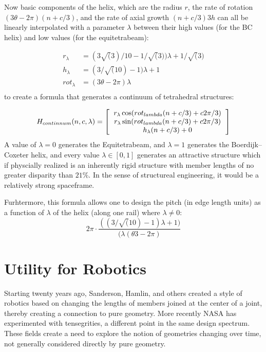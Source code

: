 \documentclass[11pt]{article}
\begin{document}
Now basic components of the helix, which are the radius $r$, the rate of rotation $(3 \theta - 2 \pi)(n + c/3)$, and the rate of
axial growth $ (n + c/3) 3  h $ can all be linearly interpolated with a parameter $\lambda$ between their high values (for the BC helix)
and low values (for the equitetrabeam):

\begin{align*}
r_{\lambda}  &= (3 \sqrt(3) / 10 - 1/\sqrt(3)) \lambda +  1/\sqrt(3) \\
h_{\lambda} &=  (3 / \sqrt(10) - 1) \lambda + 1 \\
rot_{\lambda} &= (3 \theta - 2 \pi) \lambda  \\
\end{align*}
to create a formula that generates a continuum of tetrahedral structures:

\[
H_{continnum}(n,c,\lambda) =
\left [
  \begin{tabular}{c}
   $ r_{\lambda} \cos(rot_{lambda} (n + c/3) + c 2 \pi /3) $\\
   $ r_{\lambda}  \sin(rot_{lambda} (n + c/3) + c 2 \pi /3) $\\
   $ h_{\lambda} (n + c/3) + 0 $
  \end{tabular}
\right ]
\]
A value of $\lambda = 0$ generates the Equitetrabeam, and $\lambda = 1$ generates the Boerdijk--Coxeter helix, and every
value $\lambda \in [0,1]$ generates an attractive structure which if physcially realized is an inherently rigid structure
with member lengths of no greater disparity than $21\%$.
In the sense of structureal engineering, it would be a relatively strong spaceframe.

Furhtermore, this formula allows one to design the pitch (in edge length units) as a function of $\lambda$ of the helix (along one rail)
where $\lambda \neq 0$:
\[
2 \pi  \cdot \frac{((3/\sqrt(10) -1) \lambda +1)}{ (\lambda ( \theta 3 - 2 \pi)}
\]


\section{Utility for Robotics}

Starting twenty years ago, Sanderson, Hamlin, and others created a style of robotics based on changing the lengths of members
joined at the center of a joint, thereby creating a connection to pure geometry. More recently NASA has experimented with
tensegrities, a different point in the same design spectrum. These fields create a need to explore the notion of
geometries changing over time, not generally considered directly by pure geometry.
\end{document}
